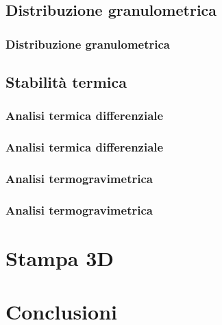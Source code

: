\documentclass[15pt, aspectratio=169]{beamer}
\begin{document}
    \subsection{Distribuzione granulometrica}

    \begin{frame}
      \frametitle{Distribuzione granulometrica}


    \end{frame}

    \subsection{Stabilità termica}

      \subsubsection{Analisi termica differenziale}

        \begin{frame}
          \frametitle{Analisi termica differenziale}
        
          
        
        \end{frame}
      \subsubsection{Analisi termogravimetrica}

        \begin{frame}
          \frametitle{Analisi termogravimetrica}
        
          
        
        \end{frame}


\section{Stampa 3D}
\section{Conclusioni}
\end{document}
